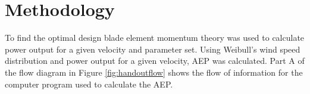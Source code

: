 \documentclass[11pt]{article}
\begin{document}
\section{Methodology}

To find the optimal design blade element momentum theory was used to calculate power output for a given velocity and parameter set. Using Weibull's wind speed distribution and power output for a given velocity, AEP was calculated. Part A of the flow diagram in Figure \ref{fig:handoutflow} shows the flow of information for the computer program used to calculate the AEP.\\
\end{document}
